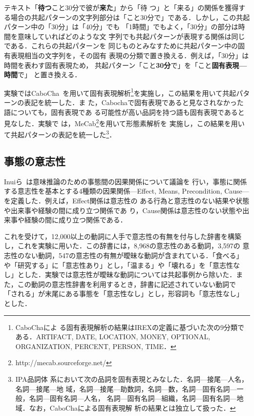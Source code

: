 \documentclass[japanese]{jnlp_1.4}
\begin{document}
テキスト「\textbf{待つ}こと30分で彼が\textbf{来た}」から「待
つ」と「来る」の関係を獲得する場合の共起パターンの文字列部分は「こと30分で」である．しかし，この共起パターン中の「30分」は「40分」でも
「1時間」でもよく，「30分」の部分は時間を意味していればどのような文
字列でも共起パターンが表現する関係は同じである．これらの共起パターンを
同じものとみなすために共起パターン中の固有表現相当の文字列を，その固有
表現の分類で置き換える．例えば，「30分」は時間を表わす固有表現ため，
共起パターン「こと\textbf{30分}で」を「こと\textbf{固有表現—時間}で」
と置き換える．

実験ではCaboCha~\cite{cabocha}を用いて固有表現解析\footnote{CaboChaによ
  る固有表現解析の結果はIREXの定義に基づいた次の9分類である．ARTIFACT,
  DATE, LOCATION, MONEY, OPTIONAL, ORGANIZATION, PERCENT, PERSON,
  TIME．}を実施し，この結果を用いて共起パターンの表記を統一した．ま
た，Cabochaで固有表現であると見なされなかった語についても，固有表現であ
る可能性が高い品詞を持つ語も固有表現であると見なした．実験で
は，MeCab\footnote{http://mecab.sourceforge.net/}を用いて形態素解析を
実施し，この結果を用いて共起パターンの表記を統一した\footnote{IPA品詞体
  系において次の品詞を固有表現とみなした．名詞—接尾—人名，名詞—接尾—地
  域，名詞—接尾—助数詞，名詞—数，名詞—固有名詞—一般，名詞—固有名詞—人名，
  名詞—固有名詞—組織，名詞—固有名詞—地域．なお，CaboChaによる固有表現解
  析の結果とは独立して扱った．}．


\subsection{事態の意志性}
\label{ssec:volition}

Inuiら~\cite{inui:DS03}は意味推論のための事態間の因果関係について議論を
行い，事態に関係する意志性を基本とする4種類の因果関係---Effect,
Means, Precondition, Cause---を定義した．例えば，Effect関係は意志性の
ある行為と意志性のない結果や状態や出来事や経験の間に成り立つ関係であ
り，Cause関係は意志性のない状態や出来事や経験の間に成り立つ関係である．

これを受けて，12,000以上の動詞に人手で意志性の有無を付与した辞書を構築
し，これを実験に用いた．この辞書には，8,968の意志性のある動詞，3,597の
意志性のない動詞，547の意志性の有無が曖昧な動詞が含まれている．「食べる」
や「研究する」に「意志性あり」とし，「温まる」や「壊れる」を「意志性な
し」とした．実験では意志性が曖昧な動詞については共起事例から除いた．ま
た，この動詞の意志性辞書を利用するとき，辞書に記述されていない動詞で
「される」が末尾にある事態を「意志性なし」とし，形容詞も「意志性なし」
とした．
\end{document}
